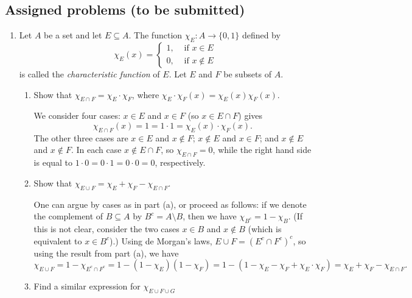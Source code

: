 \documentclass[letterpaper,12pt]{article}
\begin{document}
\subsection*{Assigned problems (to be submitted)}
\begin{enumerate}
 \item Let $A$ be a set and let $E\subseteq A$. The function $\chi_E:A\to\{0,1\}$ defined by
\[
 \chi_E(x) = \begin{cases}1, & \text{ if } x\in E\\ 0, & \text{ if } x\notin E\end{cases}
\]
is called the {\em characteristic function} of $E$. Let $E$ and $F$ be subsets of $A$.
\begin{enumerate}
 \item Show that $\chi_{E\cap F} = \chi_E\cdot \chi_F$, where $\chi_E\cdot\chi_F(x) = \chi_E(x)\chi_F(x)$.

\bigskip

We consider four cases: $x\in E$ and $x\in F$ (so $x\in E\cap F$) gives 
\[ 
\chi_{E\cap F}(x) = 1 = 1\cdot 1 = \chi_E(x)\cdot \chi_F(x). 
\]
The other three cases are $x\in E$ and $x\notin F$; $x\notin E$ and $x\in F$; and $x\notin E$ and $x\notin F$. In each case $x\notin E\cap F$, so $\chi_{E\cap F}=0$, while the right hand side is equal to $1\cdot 0 = 0\cdot 1 = 0\cdot 0 = 0$, respectively.

 \item Show that $\chi_{E\cup F} = \chi_E+\chi_F-\chi_{E\cap F}$.

\bigskip

One can argue by cases as in part (a), or proceed as follows: if we denote the complement of $B\subseteq A$ by $B^c=A\setminus B$, then we have $\chi_{B^c} = 1-\chi_B$. (If this is not clear, consider the two cases $x\in B$ and $x\notin B$ (which is equivalent to $x\in B^c$).) Using de Morgan's laws, $E\cup F = (E^c\cap F^c)^c$, so using the result from part (a), we have
\[
 \chi_{E\cup F} = 1-\chi_{E^c\cap F^c} = 1 - (1-\chi_E)(1-\chi_F) = 1 - (1 -\chi_E-\chi_F+\chi_E\cdot\chi_F) = \chi_E+\chi_F-\chi_{E\cap F}.
\]

 \item Find a similar expression for $\chi_{E\cup F\cup G}$

\bigskip


\end{enumerate}
\end{enumerate}
\end{document}
